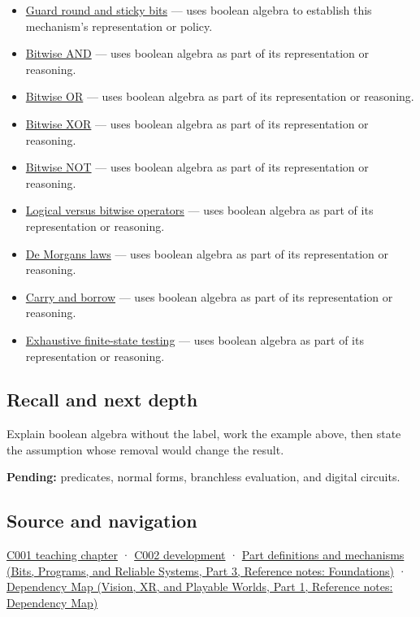 \begin{itemize}
\item
  \hyperref[appendix-b572b631069b]{Guard round and sticky bits} --- uses boolean algebra to establish this mechanism's representation or policy.
\item
  \hyperref[appendix-68b52453737c]{Bitwise AND} --- uses boolean algebra as part of its representation or reasoning.
\item
  \hyperref[appendix-a427ce8ce8a6]{Bitwise OR} --- uses boolean algebra as part of its representation or reasoning.
\item
  \hyperref[appendix-d49161831368]{Bitwise XOR} --- uses boolean algebra as part of its representation or reasoning.
\item
  \hyperref[appendix-8f38927cfc54]{Bitwise NOT} --- uses boolean algebra as part of its representation or reasoning.
\item
  \hyperref[appendix-fe6b457d68d8]{Logical versus bitwise operators} --- uses boolean algebra as part of its representation or reasoning.
\item
  \hyperref[appendix-9079d3659da4]{De Morgan\textquotesingle s laws} --- uses boolean algebra as part of its representation or reasoning.
\item
  \hyperref[appendix-d52d5f78ffd1]{Carry and borrow} --- uses boolean algebra as part of its representation or reasoning.
\item
  \hyperref[appendix-05db24ccc28a]{Exhaustive finite-state testing} --- uses boolean algebra as part of its representation or reasoning.
\end{itemize}

\subsection{Recall and next depth}\label{appendix-24475e1596a8-recall-and-next-depth}

\hypertarget{appendix-24475e1596a8-recall-and-next-depth}{}

Explain boolean algebra without the label, work the example above, then state the assumption whose removal would change the result.

\textbf{Pending:} predicates, normal forms, branchless evaluation, and digital circuits.

\subsection{Source and navigation}\label{appendix-24475e1596a8-source-and-navigation}

\hypertarget{appendix-24475e1596a8-source-and-navigation}{}

\hyperref[01-foundations-i-ch001-from-a-signal-to-an-interpretation]{C001 teaching chapter} · \hyperref[01-foundations-i-ch001-arithmetic-becomes-a-policy]{C002 development} · \href{../01-Bits-Programs-and-Reliable-Systems-P03/main.pdf\#appendix-fd090d982a15}{Part definitions and mechanisms (Bits, Programs, and Reliable Systems, Part 3, Reference notes: Foundations)} · \href{../07-Vision-XR-and-Playable-Worlds-P01/main.pdf\#appendix-4ad47bdd269a}{Dependency Map (Vision, XR, and Playable Worlds, Part 1, Reference notes: Dependency Map)}
